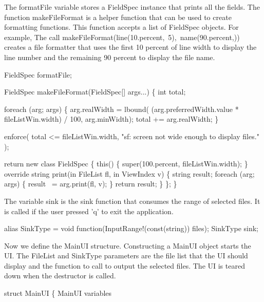 \nwendcode{}The {\Tt{}formatFile\nwendquote} variable stores a {\Tt{}FieldSpec\nwendquote} instance that
prints all the fields. The function {\Tt{}makeFileFormat\nwendquote} is a helper
function that can be used to create formatting functions. This
function accepts a list of {\Tt{}FieldSpec\nwendquote} objects. For example, The
call {\Tt{}makeFileFormat(\nwendquote}{\Tt{}line(10.percent,\ 5),\nwendquote}{\Tt{}\ name(90.percent,))\nwendquote} creates a file formatter that uses the first 10 percent of line
width to display the line number and the remaining 90 percent to
display the file name.

\nwenddocs{}\plusendmoddef\nwstartdeflinemarkup\nwenddeflinemarkup
FieldSpec formatFile;

FieldSpec makeFileFormat(FieldSpec[] args...)
\{
  int total;

  foreach (arg; args) \{
    arg.realWidth = lbound(
      (arg.preferredWidth.value * fileListWin.width) / 100,
      arg.minWidth);
    total += arg.realWidth;
  \}

  enforce(
    total <= fileListWin.width,
    "sf: screen not wide enough to display files."
  );

  return new class FieldSpec \{
    this() \{ super(100.percent, fileListWin.width); \}
    override string print(in FileList fl, in ViewIndex v) \{
      string result;
      foreach (arg; args) \{
        result ~= arg.print(fl, v);
      \}
      return result;
    \}
  \};
\}

\nwendcode{}The variable {\Tt{}sink\nwendquote} is the sink function that consumes the range
of selected files. It is called if the user pressed 'q' to exit the
application.

\nwenddocs{}\plusendmoddef\nwstartdeflinemarkup\nwenddeflinemarkup
alias SinkType =
  void function(InputRange!(const(string)) files);
SinkType sink;

\nwendcode{}Now we define the {\Tt{}MainUI\nwendquote} structure. Constructing a MainUI object
starts the UI. The {\Tt{}FileList\nwendquote} and {\Tt{}SinkType\nwendquote} parameters are the
file list that the UI should display and the function to call to
output the selected files. The UI is teared down when the destructor
is called.

\nwenddocs{}\endmoddef\nwstartdeflinemarkup\nwenddeflinemarkup
struct MainUI
\{
  \LA{}MainUI variables\RA{}
  
